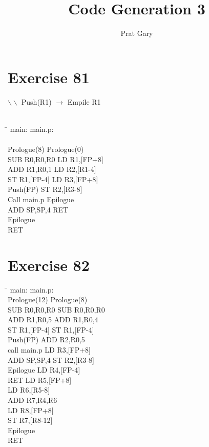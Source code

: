 \documentclass[10pt,a4paper]{article}
\author{Prat Gary}
\title{Code Generation 3}
\begin{document}
\maketitle
\section{Exercise 81}
$\backslash\backslash$ Push(R1) $\rightarrow$ Empile R1\\\\
\begin{tabbing}
\hspace{8cm}\=\kill
 main: \> main.p: \\\\
 Prologue(8) \> Prologue(0) \\ 
 SUB R0,R0,R0 \> LD R1,[FP+8] \\ 
 ADD R1,R0,1 \> LD R2,[R1-4]\\
 ST R1,[FP-4] \> LD R3,[FP+8]  \\ 
 Push(FP) \>  ST R2,[R3-8]\\ 
 Call main.p \>   Epilogue\\ 
 ADD SP,SP,4 \>  RET\\ 
 Epilogue \> \\
 RET \> \\
\end{tabbing}
\section{Exercise 82}
\begin{tabbing}
\hspace{8cm}\=\kill
main:\> main.p:\\
Prologue(12) \> Prologue(8)\\
SUB R0,R0,R0 \> SUB R0,R0,R0\\
ADD R1,R0,5 \> ADD R1,R0,4\\
ST R1,[FP-4] \> ST R1,[FP-4]\\
Push(FP) \> ADD R2,R0,5\\
call main.p \> LD R3,[FP+8]\\
ADD SP,SP,4 \> ST R2,[R3-8]\\
Epilogue \> LD R4,[FP-4]\\
RET \> LD R5,[FP+8] \\
\> LD R6,[R5-8]\\
\> ADD R7,R4,R6\\
\> LD R8,[FP+8]\\
\> ST R7,[R8-12]\\
\> Epilogue\\
\> RET\\
\end{tabbing}
\end{document}
